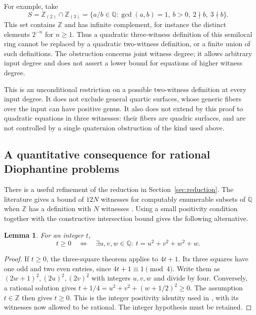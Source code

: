 \documentclass[11pt]{article}
\newtheorem{lemma}[theorem]{Lemma}
\theoremstyle{definition}
\newcommand{\Q}{\mathbb Q}
\newcommand{\Z}{\mathbb Z}
\begin{document}
For example, take
\[
 S=\mathbb Z_{(2)}\cap\mathbb Z_{(3)}
   =\{a/b\in\mathbb Q:\gcd(a,b)=1,\ b>0,\ 2\nmid b,\ 3\nmid b\}.
\]
This set contains $\mathbb Z$ and has infinite complement, for instance
the distinct elements $2^{-n}$ for $n\ge1$.  Thus a quadratic
three-witness definition of this semilocal ring cannot be replaced by a
quadratic two-witness definition, or a finite union of such definitions.
The obstruction concerns joint witness degree; it allows arbitrary input
degree and does not assert a lower bound for equations of higher witness
degree.

This is an unconditional restriction on a possible two-witness
definition at every input degree.  It does not exclude general quartic
surfaces, whose generic fibers over the input can have positive genus.
It also does not extend by this proof to quadratic equations in three
witnesses: their fibers are quadric surfaces, and are not controlled by
a single quaternion obstruction of the kind used above.


\subsection{A quantitative consequence for rational Diophantine problems}
\label{subsec:quantitative-mrdp}

There is a useful refinement of the reduction in
Section~\ref{sec:reduction}. The literature gives a bound of $12N$
witnesses for computably enumerable subsets of $\Q$ when $\Z$ has
a definition with $N$ witnesses \cite[Remark 8.23]{DDF2025}.
Using a small positivity condition together with the constructive
intersection bound gives the following alternative.

\begin{lemma}\label{lem:integer-positivity-rational}
For an integer $t$,
\[
 t\ge0\quad\Longleftrightarrow\quad
 \exists u,v,w\in\Q:\ t=u^2+v^2+w^2+w.
\]
\end{lemma}
\begin{proof}
If $t\ge0$, the three-square theorem applies to $4t+1$.
Its three squares have one odd and two even entries, since
$4t+1\equiv1\pmod4$. Write them as $(2w+1)^2,(2u)^2,(2v)^2$
with integers $u,v,w$ and divide by four. Conversely, a rational
solution gives
$t+1/4=u^2+v^2+(w+1/2)^2\ge0$. The assumption $t\in\Z$
then gives $t\ge0$. This is the integer positivity identity used
in \cite[Equation (1.1)]{Sun2021}, with its witnesses now allowed
to be rational. The integer hypothesis must be retained.
\end{proof}
\end{document}
